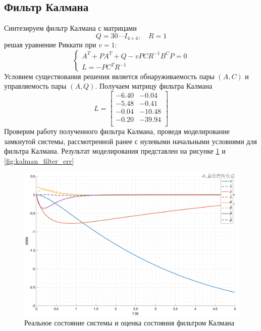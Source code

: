 \FloatBarrier
\subsection{Фильтр Калмана}
Синтезируем фильтр Калмана с матрицами
\begin{equation}
    Q = 30 \cdot \cdot I_{4\times 4}, \quad R = 1
\end{equation}
решая уравнение Риккати при $v = 1$:
\begin{equation}
    \begin{cases}
        A^T + PA^T + Q - vPCR^{-1}B^CP = 0 \\ 
        L = -PC^TR^{-1}
    \end{cases}
\end{equation}
Условием существования решения является обнаруживаемость пары $(A, C)$ и управляемость пары $(A, Q)$. 
Получаем матрицу фильтра Калмана
\begin{equation}
    L = \begin{bmatrix}
        -6.40  & -0.04 \\ 
        -5.48  & -0.41 \\ 
        -0.04  & -10.48 \\ 
        -0.20  & -39.94 \\ 
    \end{bmatrix}
\end{equation}
Проверим работу полученного фильтра Калмана, проведя моделирование замкнутой системы, рассмотренной ранее 
с нулевыми начальными условиями для фильтра Калмана. Результат моделирования представлен на рисунке \ref{fig:kalman_filter} и 
\ref{fig:kalman_filter_err}
\begin{figure}[ht!]
    \centering
    \includegraphics[width=\textwidth]{media/plots/kalman/observer_cmp_1.png}
    \caption{Реальное состояние системы и оценка состояния фильтром Калмана}
    \label{fig:kalman_filter}
\end{figure}
